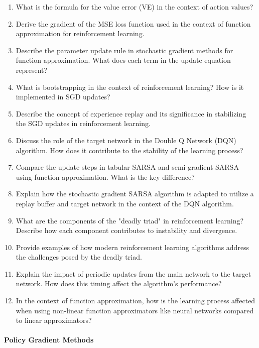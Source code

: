 \begin{enumerate}
	\item What is the formula for the value error (VE) in the context of action values?
    \item Derive the gradient of the MSE loss function used in the context of function approximation for reinforcement learning.
	\item Describe the parameter update rule in stochastic gradient methods for function approximation. What does each term in the update equation represent?
    \item What is bootstrapping in the context of reinforcement learning? How is it implemented in SGD updates?
    \item Describe the concept of experience replay and its significance in stabilizing the SGD updates in reinforcement learning.
    \item Discuss the role of the target network in the Double Q Network (DQN) algorithm. How does it contribute to the stability of the learning process?
    \item Compare the update steps in tabular SARSA and semi-gradient SARSA using function approximation. What is the key difference?
    \item Explain how the stochastic gradient SARSA algorithm is adapted to utilize a replay buffer and target network in the context of the DQN algorithm.
    \item What are the components of the "deadly triad" in reinforcement learning? Describe how each component contributes to instability and divergence.
    \item Provide examples of how modern reinforcement learning algorithms address the challenges posed by the deadly triad.
    \item Explain the impact of periodic updates from the main network to the target network. How does this timing affect the algorithm's performance?
    \item In the context of function approximation, how is the learning process affected when using non-linear function approximators like neural networks compared to linear approximators?
\end{enumerate}

\paragraph*{Policy Gradient Methods}

